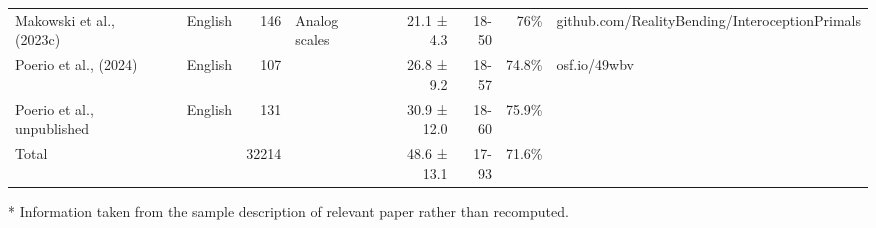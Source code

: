 \begin{table}
\begin{tabular*}{\linewidth}{@{\extracolsep{\fill}}lllrlrrrl}
Makowski et al., (2023c) &  & English & 146 & Analog scales & 21.1 ± 4.3 & 18-50 & 76\% & github.com/RealityBending/InteroceptionPrimals \\ 
Poerio et al., (2024) &  & English & 107 &  & 26.8 ± 9.2 & 18-57 & 74.8\% & osf.io/49wbv \\ 
Poerio et al., unpublished &  & English & 131 &  & 30.9 ± 12.0 & 18-60 & 75.9\% &  \\ 
Total &  &  & 32214 &  & 48.6 ± 13.1 & 17-93 & 71.6\% &  \\ 
\bottomrule
\end{tabular*}
\begin{minipage}{\linewidth}
* Information taken from the sample description of relevant paper rather than recomputed.\\
\end{minipage}
\end{table}

